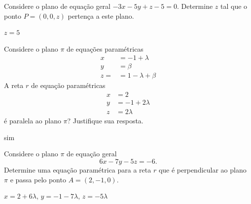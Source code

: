 \begin{exer}
  Considere o plano de equação geral $-3x -5y + z - 5 = 0$. Determine $z$ tal que o ponto $P=(0,0,z)$ pertença a este plano.
\end{exer}
\begin{resp}
  $z=5$
\end{resp}

\begin{exer}
  Considere o plano $\pi$ de equações paramétricas
  \begin{align}
    x &= -1 + \lambda\\
    y &= \beta \\
    z = &= 1 - \lambda + \beta
  \end{align}
  A reta $r$ de equação paramétricas
  \begin{align}
    x &= 2\\
    y &= -1 + 2\lambda\\
    z &= 2\lambda
  \end{align}
  é paralela ao plano $\pi$? Justifique sua resposta.
\end{exer}
\begin{resp}
  sim
\end{resp}

\begin{exer}
  Considere o plano $\pi$ de equação geral
  \begin{equation}
    6x -7y - 5z = -6.
  \end{equation}
  Determine uma equação paramétrica para a reta $r$ que é perpendicular ao plano $\pi$ e passa pelo ponto $A=(2,-1,0)$.
\end{exer}
\begin{resp}
  $x=2+6\lambda$, $y=-1-7\lambda$, $z=-5\lambda$
\end{resp}
